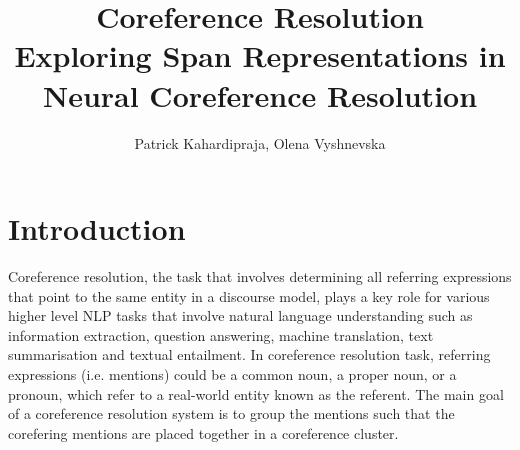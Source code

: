 \documentclass[11pt]{article}
\title{{\LARGE Coreference Resolution}\\[1.5mm]
{\large Exploring Span Representations in Neural Coreference Resolution}\\[1.5mm]} %
\author{Patrick Kahardipraja, Olena Vyshnevska}%
\date{} %
\begin{document}
\maketitle


\section{Introduction}










Coreference resolution, the task that involves determining all referring expressions that point to the same entity in a discourse model, plays a key role for various higher level NLP tasks that involve natural language understanding such as information extraction, question answering, machine translation, text summarisation and textual entailment. In coreference resolution task, referring expressions (i.e. mentions) could be a common noun, a proper noun, or a pronoun, which refer to a real-world entity known as the referent. The main goal of a coreference resolution system is to group the mentions such that the corefering mentions are placed together in a coreference cluster.
\end{document}
